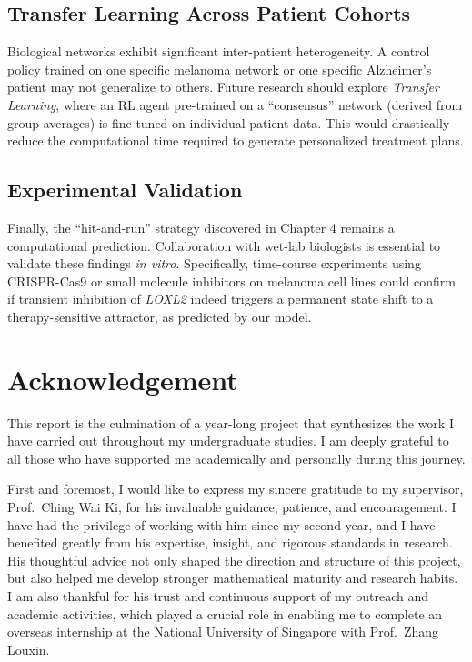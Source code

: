 \documentclass[12pt, a4paper]{report}
\begin{document}
\subsection{Transfer Learning Across Patient Cohorts}
Biological networks exhibit significant inter-patient heterogeneity. A control policy trained on one specific melanoma network or one specific Alzheimer's patient may not generalize to others. Future research should explore \textit{Transfer Learning}, where an RL agent pre-trained on a ``consensus'' network (derived from group averages) is fine-tuned on individual patient data. This would drastically reduce the computational time required to generate personalized treatment plans.

\subsection{Experimental Validation}
Finally, the ``hit-and-run'' strategy discovered in Chapter 4 remains a computational prediction. Collaboration with wet-lab biologists is essential to validate these findings \textit{in vitro}. Specifically, time-course experiments using CRISPR-Cas9 or small molecule inhibitors on melanoma cell lines could confirm if transient inhibition of \textit{LOXL2} indeed triggers a permanent state shift to a therapy-sensitive attractor, as predicted by our model.



\section*{Acknowledgement}
This report is the culmination of a year-long project that synthesizes the work I have carried out throughout my undergraduate studies. I am deeply grateful to all those who have supported me academically and personally during this journey.

First and foremost, I would like to express my sincere gratitude to my supervisor, Prof.\ Ching Wai Ki, for his invaluable guidance, patience, and encouragement. I have had the privilege of working with him since my second year, and I have benefited greatly from his expertise, insight, and rigorous standards in research. His thoughtful advice not only shaped the direction and structure of this project, but also helped me develop stronger mathematical maturity and research habits. I am also thankful for his trust and continuous support of my outreach and academic activities, which played a crucial role in enabling me to complete an overseas internship at the National University of Singapore with Prof.\ Zhang Louxin.
\end{document}
